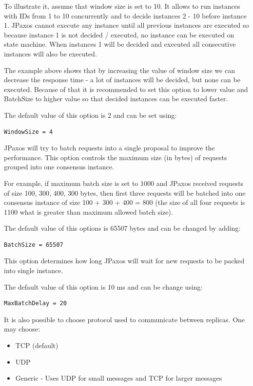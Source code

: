 To illustrate it, assume that window size is set to 10. It allows to run
instances with IDs from 1 to 10 concurrently and to decide instances 2 - 10
before instance 1. JPaxos cannot execute any instance until all previous
instances are executed so because instance 1 is not decided / executed, no
instance can be executed on state machine. When instances 1 will be
decided and executed all consecutive instances will also be executed.

The example above shows that by increasing the value of window size we can
decrease the response time - a lot of instances will be decided, but none can
be executed. Because of that it is recommended to set this option to lower
value and BatchSize to higher value so that decided instances can be executed
faster.

The default value of this option is 2 and can be set using:
\begin{Verbatim}
WindowSize = 4
\end{Verbatim}

\label{config:batch-size}
JPaxos will try to batch requests into a single proposal to improve the
performance. This option controls the maximum size (in bytes) of requests
grouped into one consensus instance.

For example, if maximum batch size is set to 1000 and JPaxos received requests
of size 100, 300, 400, 300 bytes, then first three requests will be batched
into one consensus instance of size 100 + 300 + 400 = 800 (the size of all four
requests is 1100 what is greater than maximum allowed batch size).

The default value of this options is 65507 bytes and can be changed by adding:
\begin{Verbatim}
BatchSize = 65507
\end{Verbatim}


\label{config:maximum-batch-delay}
This option determines how long JPaxos will wait for new requests to be packed
into single instance.

The default value of this option is 10 ms and can be change using:
\begin{Verbatim}
MaxBatchDelay = 20
\end{Verbatim}


\label{config:network-protocol}
It is also possible to choose protocol used to communicate between replicas.
One may choose:
\begin{itemize}
\item {} 
TCP (default)

\item {} 
UDP

\item {} 
Generic - Uses UDP for small messages and TCP for larger messages

\end{itemize}

